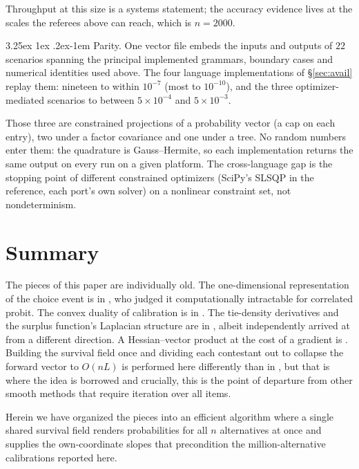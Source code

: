 \documentclass[11pt]{article}
\makeatletter
\renewcommand\paragraph{\@startsection{paragraph}{4}{\z@}%
  {3.25ex \@plus1ex \@minus.2ex}{-1em}%
  {\normalfont\normalsize\itshape}}
\makeatother
\begin{document}
Throughput at this size is a systems statement; the accuracy
evidence lives at the scales the referees above can reach, which is
$n=2000$.

\paragraph{Parity.} One vector file embeds the inputs and outputs of
$22$ scenarios spanning the principal implemented grammars, boundary
cases and numerical identities used above. The four language
implementations of \S\ref{sec:avail} replay them: nineteen to within
$10^{-7}$ (most to $10^{-10}$), and the three optimizer-mediated
scenarios to between $5\times10^{-4}$ and $5\times10^{-3}$.

Those three are constrained projections of a probability vector (a cap
on each entry), two under a factor covariance and one under a tree. No
random numbers enter them: the quadrature is Gauss--Hermite, so each
implementation returns the same output on every run on a given platform.
The cross-language gap is the stopping point of different constrained
optimizers (SciPy's SLSQP in the reference, each port's own solver)
on a nonlinear constraint set, not nondeterminism.

\section{Summary}\label{sec:summary}

The pieces of this paper are individually old. The one-dimensional
representation of the choice event is in \citet{domencich1975}, who
judged it computationally intractable for correlated probit. The convex
duality of calibration is in \citet{li2018}. The tie-density
derivatives and the surplus function's Laplacian structure are in
\citet{muller2022}, albeit independently arrived at from a different direction. A Hessian--vector product at the cost of a gradient
is \citet{pearlmutter1994}. Building the survival field once and dividing each contestant out to collapse the forward vector to $O(nL)$ is performed here differently than in \citet{cotton2021}, but that is where the idea is borrowed and crucially, this is the point of departure from other smooth methods that require iteration over all items.

Herein we have organized the pieces into an efficient algorithm where a
single shared survival field renders probabilities for all $n$
alternatives at once and supplies the own-coordinate slopes that
precondition the million-alternative calibrations reported here.
\end{document}
